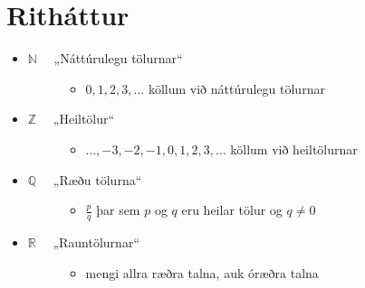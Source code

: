 \documentclass[a4paper,10pt,icelandic]{sphinxmanual}
\begin{document}
\section{Ritháttur}
\label{\detokenize{Kafli12:rithattur}}\begin{itemize}
\item {} \begin{description}
\item[{\(\mathbb{N} \quad\) „Náttúrulegu tölurnar“}] \leavevmode\begin{itemize}
\item {} 
\(0,1,2,3, \dots\) köllum við náttúrulegu tölurnar

\end{itemize}

\end{description}

\item {} \begin{description}
\item[{\(\mathbb{Z} \quad\) „Heiltölur“}] \leavevmode\begin{itemize}
\item {} 
\(\dots ,-3, -2, -1, 0,1,2,3, \dots\) köllum við heiltölurnar

\end{itemize}

\end{description}

\item {} \begin{description}
\item[{\(\mathbb{Q} \quad\) „Ræðu tölurna“}] \leavevmode\begin{itemize}
\item {} 
\(\frac{p}{q}\) þar sem \(p\) og \(q\) eru heilar tölur og \(q \neq 0\)

\end{itemize}

\end{description}

\item {} \begin{description}
\item[{\(\mathbb{R} \quad\) „Rauntölurnar“}] \leavevmode\begin{itemize}
\item {} 
mengi allra ræðra talna, auk óræðra talna

\end{itemize}

\end{description}


\end{itemize}
\end{document}
